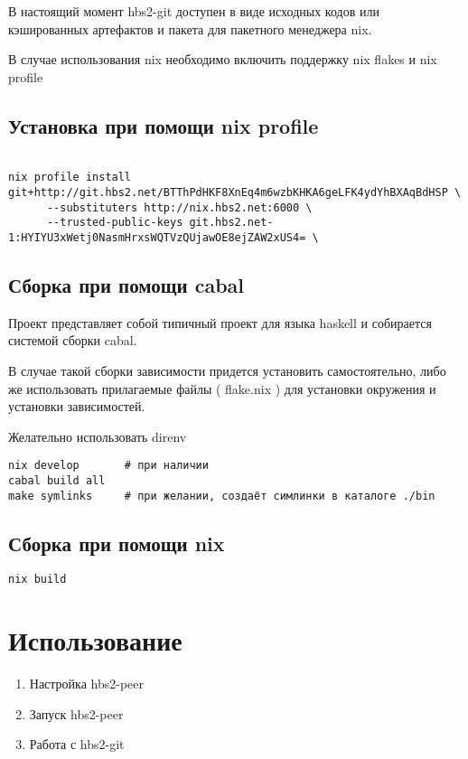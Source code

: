 \documentclass[11pt,a4paper]{article}
\begin{document}
В настоящий момент hbs2-git доступен в виде исходных кодов или кэшированных
артефактов и пакета для пакетного менеджера nix.

В случае использования nix необходимо включить поддержку nix flakes и nix profile

\subsection{Установка при помощи nix profile}

\begin{verbatim}

nix profile install git+http://git.hbs2.net/BTThPdHKF8XnEq4m6wzbKHKA6geLFK4ydYhBXAqBdHSP \
      --substituters http://nix.hbs2.net:6000 \
      --trusted-public-keys git.hbs2.net-1:HYIYU3xWetj0NasmHrxsWQTVzQUjawOE8ejZAW2xUS4= \
\end{verbatim}

\subsection{Сборка при помощи cabal}

Проект представляет собой типичный проект для языка haskell и собирается системой сборки cabal.

В случае такой сборки зависимости придется установить самостоятельно, либо же использовать
прилагаемые файлы ( flake.nix ) для установки окружения и установки зависимостей.

Желательно использовать direnv

\begin{verbatim}
nix develop       # при наличии
cabal build all
make symlinks     # при желании, создаёт симлинки в каталоге ./bin
\end{verbatim}

\subsection{Сборка при помощи nix}

\begin{verbatim}
nix build
\end{verbatim}

\section{Использование}

\begin{enumerate}
  \item Настройка hbs2-peer
  \item Запуск hbs2-peer
  \item Работа с hbs2-git
\end{enumerate}
\end{document}
